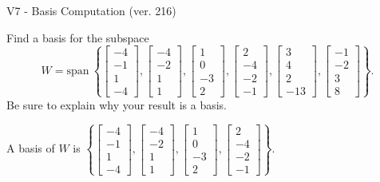\begin{exercise}
  \begin{exerciseTitle}V7 - Basis Computation (ver. 216)\end{exerciseTitle}
  \begin{exerciseStatement}
    Find a basis for the subspace 
\[W=\mathrm{span}\ \left\{\left[\begin{array}{r}
-4 \\
-1 \\
1 \\
-4
\end{array}\right] , \left[\begin{array}{r}
-4 \\
-2 \\
1 \\
1
\end{array}\right] , \left[\begin{array}{r}
1 \\
0 \\
-3 \\
2
\end{array}\right] , \left[\begin{array}{r}
2 \\
-4 \\
-2 \\
-1
\end{array}\right] , \left[\begin{array}{r}
3 \\
4 \\
2 \\
-13
\end{array}\right] , \left[\begin{array}{r}
-1 \\
-2 \\
3 \\
8
\end{array}\right]\right\}.\]
 Be sure to explain why your result is a basis.


  \end{exerciseStatement}
  \begin{exerciseAnswer}
   A basis of \(W\) is  \(\left\{\left[\begin{array}{r}
-4 \\
-1 \\
1 \\
-4
\end{array}\right] , \left[\begin{array}{r}
-4 \\
-2 \\
1 \\
1
\end{array}\right] , \left[\begin{array}{r}
1 \\
0 \\
-3 \\
2
\end{array}\right] , \left[\begin{array}{r}
2 \\
-4 \\
-2 \\
-1
\end{array}\right]\right\}\).
  


  \end{exerciseAnswer}
\end{exercise}